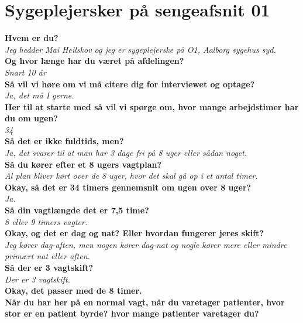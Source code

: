 \section{Sygeplejersker på sengeafsnit 01} \label{bilag01}
\textbf{Hvem er du?} \\
\noindent
\textit{Jeg hedder Mai Heilskov og jeg er sygeplejerske på O1, Aalborg sygehus syd. } \\
\noindent
\textbf{Og hvor længe har du været på afdelingen?}\\
\noindent
\textit{Snart 10 år} \\
\noindent
\textbf{Så vil vi høre om vi må citere dig for interviewet og optage?}\\
\noindent
\textit{ Ja, det må I gerne.}  \\
\noindent
\textbf{Her til at starte med så vil vi spørge om, hvor mange arbejdstimer har du om ugen?} \\
\noindent
\textit{34} \\
\noindent
\textbf{Så det er ikke fuldtids, men?} \\
\noindent
\textit{Ja, det svarer til at man har 3 dage fri på 8 uger eller sådan noget.} \\
\noindent
\textbf{Så du kører efter et 8 ugers vagtplan?} \\
\noindent
\textit{Al plan bliver kørt over de 8 uger, hvor det skal gå op i et antal timer.} \\
\noindent
\textbf{Okay, så det er 34 timers gennemsnit om ugen over 8 uger?} \\
\noindent
\textit{Ja.} \\
\noindent
\textbf{Så din vagtlængde det er 7,5 time? } \\
\noindent
\textit{8 eller 9 timers vagter.} \\
\noindent
\textbf{Okay, og det er dag og nat? Eller hvordan fungerer jeres skift?} \\
\noindent
\textit{Jeg kører dag-aften, men nogen kører dag-nat og nogle kører mere eller mindre primært nat eller aften.} \\
\noindent
\textbf{Så der er 3 vagtskift?} \\
\noindent
\textit{Der er 3 vagtskift.} \\
\noindent
\textbf{Okay, det passer med de 8 timer.} \\
\noindent
\textbf{Når du har her på en normal vagt, når du varetager patienter, hvor stor er en patient byrde? hvor mange patienter varetager du?} \\
\noindent
